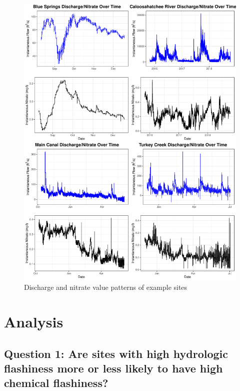 \documentclass[12pt,]{article}
\begin{document}
\begin{figure}
\centering
\includegraphics{Final-Project-Report_files/figure-latex/unnamed-chunk-7-1.pdf}
\caption{Discharge and nitrate value patterns of example sites}
\end{figure}

\newpage

\hypertarget{analysis}{%
\section{Analysis}\label{analysis}}

\hypertarget{question-1-are-sites-with-high-hydrologic-flashiness-more-or-less-likely-to-have-high-chemical-flashiness}{%
\subsection{Question 1: Are sites with high hydrologic flashiness more
or less likely to have high chemical
flashiness?}\label{question-1-are-sites-with-high-hydrologic-flashiness-more-or-less-likely-to-have-high-chemical-flashiness}}
\end{document}

